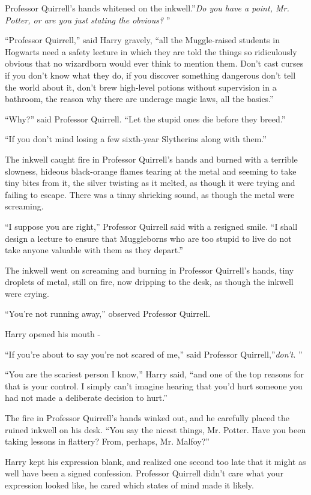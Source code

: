 Professor Quirrell's hands whitened on the inkwell.''\emph{Do you have a
point, Mr. Potter, or are you just stating the obvious?} ''

``Professor Quirrell,'' said Harry gravely, ``all the Muggle-raised
students in Hogwarts need a safety lecture in which they are told the
things so ridiculously obvious that no wizardborn would ever think to
mention them. Don't cast curses if you don't know what they do, if you
discover something dangerous don't tell the world about it, don't brew
high-level potions without supervision in a bathroom, the reason why
there are underage magic laws, all the basics.''

``Why?'' said Professor Quirrell. ``Let the stupid ones die before they
breed.''

``If you don't mind losing a few sixth-year Slytherins along with
them.''

The inkwell caught fire in Professor Quirrell's hands and burned with a
terrible slowness, hideous black-orange flames tearing at the metal and
seeming to take tiny bites from it, the silver twisting as it melted, as
though it were trying and failing to escape. There was a tinny shrieking
sound, as though the metal were screaming.

``I suppose you are right,'' Professor Quirrell said with a resigned
smile. ``I shall design a lecture to ensure that Muggleborns who are too
stupid to live do not take anyone valuable with them as they depart.''

The inkwell went on screaming and burning in Professor Quirrell's hands,
tiny droplets of metal, still on fire, now dripping to the desk, as
though the inkwell were crying.

``You're not running away,'' observed Professor Quirrell.

Harry opened his mouth -

``If you're about to say you're not scared of me,'' said Professor
Quirrell,''\emph{don't.} ''

``You are the scariest person I know,'' Harry said, ``and one of the top
reasons for that is your control. I simply can't imagine hearing that
you'd hurt someone you had not made a deliberate decision to hurt.''

The fire in Professor Quirrell's hands winked out, and he carefully
placed the ruined inkwell on his desk. ``You say the nicest things, Mr.
Potter. Have you been taking lessons in flattery? From, perhaps, Mr.
Malfoy?''

Harry kept his expression blank, and realized one second too late that
it might as well have been a signed confession. Professor Quirrell
didn't care what your expression looked like, he cared which states of
mind made it likely.


